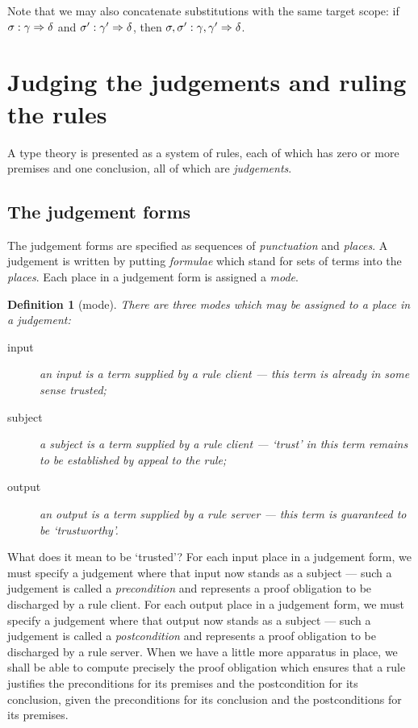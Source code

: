 \documentclass{jfp1}
\newtheorem{definition}[theorem]{Definition}
\begin{document}
Note that we may also concatenate substitutions with the same target
scope: if $\sigma : \gamma \Rightarrow \delta$ and
$\sigma' : \gamma'\Rightarrow\delta$, then
$\sigma,\sigma' : \gamma,\gamma'\Rightarrow\delta$.


\section{Judging the judgements and ruling the rules}

A type theory is presented as a system of rules, each of which has
zero or more premises and one conclusion, all of which are \emph{judgements}.

\subsection{The judgement forms}

The judgement forms are specified as sequences of \emph{punctuation} and \emph{places}.
A judgement is written by putting \emph{formulae} which stand for sets of terms into the
\emph{places}. Each place in a judgement form is assigned a \emph{mode}.

\begin{definition}[mode]
  There are three modes which may be assigned to a place in a judgement:
  \begin{description}
  \item[input] an input is a term supplied by a rule client ---
    this term is already in some sense trusted;
  \item[subject] a subject is a term supplied by a rule client ---
    `trust' in this term remains to be established by appeal to the rule;
  \item[output] an output is a term supplied by a rule server ---
    this term is guaranteed to be `trustworthy'.
  \end{description}
\end{definition}

What does it mean to be `trusted'? For each input place in a judgement
form, we must specify a judgement where that input now stands as a
subject --- such a judgement is called a \emph{precondition} and
represents a proof obligation to be discharged by a rule client. For
each output place in a judgement form, we must specify a judgement
where that output now stands as a subject --- such a judgement is
called a \emph{postcondition} and represents a proof obligation to be
discharged by a rule server. When we have a little more apparatus in
place, we shall be able to compute precisely the proof obligation which ensures
that a rule justifies the preconditions for its premises and the postcondition
for its conclusion, given the preconditions for its conclusion and the postconditions
for its premises.
\end{document}

